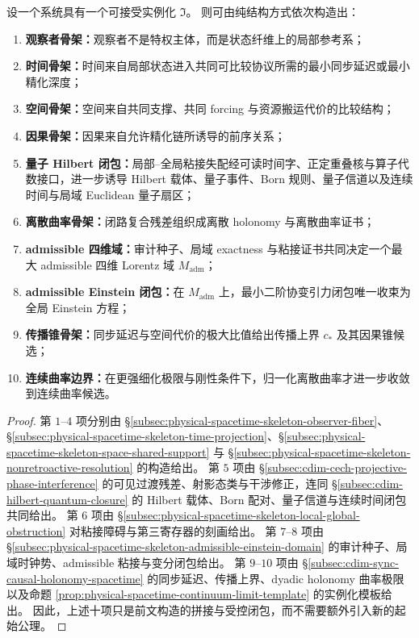 \begin{theorem}[从统一上位逻辑到物理时空骨架的程序性总链]\label{thm:physical-spacetime-procedural-grand-chain}
设一个系统具有一个可接受实例化 \(\mathfrak I\)。
则可由纯结构方式依次构造出：
\begin{enumerate}
  \item \textbf{观察者骨架：}观察者不是特权主体，而是状态纤维上的局部参考系；
  \item \textbf{时间骨架：}时间来自局部状态进入共同可比较协议所需的最小同步延迟或最小精化深度；
  \item \textbf{空间骨架：}空间来自共同支撑、共同 forcing 与资源搬运代价的比较结构；
  \item \textbf{因果骨架：}因果来自允许精化链所诱导的前序关系；
  \item \textbf{量子 Hilbert 闭包：}局部--全局粘接失配经可读时间字、正定重叠核与算子代数接口，进一步诱导 Hilbert 载体、量子事件、Born 规则、量子信道以及连续时间与局域 Euclidean 量子扇区；
  \item \textbf{离散曲率骨架：}闭路复合残差组织成离散 holonomy 与离散曲率证书；
  \item \textbf{admissible 四维域：}审计种子、局域 exactness 与粘接证书共同决定一个最大 admissible 四维 Lorentz 域 \(M_{\mathrm{adm}}\)；
  \item \textbf{admissible Einstein 闭包：}在 \(M_{\mathrm{adm}}\) 上，最小二阶协变引力闭包唯一收束为全局 Einstein 方程；
  \item \textbf{传播锥骨架：}同步延迟与空间代价的极大比值给出传播上界 \(c_*\) 及其因果锥候选；
  \item \textbf{连续曲率边界：}在更强细化极限与刚性条件下，归一化离散曲率才进一步收敛到连续曲率候选。
\end{enumerate}
\end{theorem}
\begin{proof}
第 \(1\)--\(4\) 项分别由 \S\ref{subsec:physical-spacetime-skeleton-observer-fiber}、\S\ref{subsec:physical-spacetime-skeleton-time-projection}、\S\ref{subsec:physical-spacetime-skeleton-space-shared-support} 与 \S\ref{subsec:physical-spacetime-skeleton-nonretroactive-resolution} 的构造给出。
第 \(5\) 项由 \S\ref{subsec:cdim-cech-projective-phase-interference} 的可见过渡残差、射影态类与干涉修正，连同 \S\ref{subsec:cdim-hilbert-quantum-closure} 的 Hilbert 载体、Born 配对、量子信道与连续时间闭包共同给出。
第 \(6\) 项由 \S\ref{subsec:physical-spacetime-skeleton-local-global-obstruction} 对粘接障碍与第三寄存器的刻画给出。
第 \(7\)--\(8\) 项由 \S\ref{subsec:physical-spacetime-skeleton-admissible-einstein-domain} 的审计种子、局域时钟势、admissible 粘接与变分闭包给出。
第 \(9\)--\(10\) 项由 \S\ref{subsec:cdim-sync-causal-holonomy-spacetime} 的同步延迟、传播上界、dyadic holonomy 曲率极限以及命题 \ref{prop:physical-spacetime-continuum-limit-template} 的实例化模板给出。
因此，上述十项只是前文构造的拼接与受控闭包，而不需要额外引入新的起始公理。
\end{proof}

